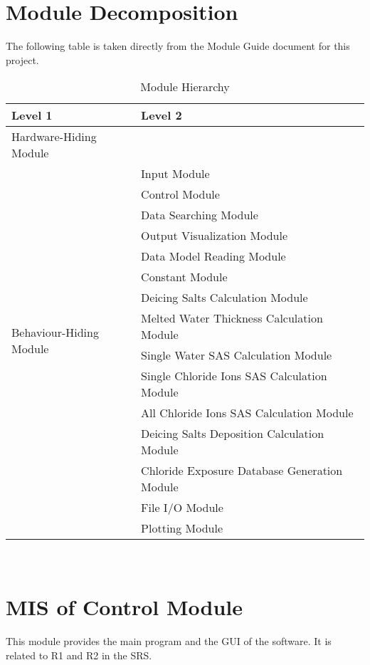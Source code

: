 \documentclass[12pt, titlepage]{article}
\begin{document}
\section{Module Decomposition}

The following table is taken directly from the Module Guide document for this project.
\begin{table}[h!]
\centering
\begin{tabular}{p{} p{}}
\toprule
\textbf{Level 1} & \textbf{Level 2}\\
\midrule

{Hardware-Hiding Module} & ~ \\
\midrule

\multirow{14}{0.3\textwidth}{Behaviour-Hiding Module} & Input Module\\
& Control Module\\
& Data Searching Module\\
& Output Visualization Module\\
& Data Model Reading Module \\
& Constant Module \\
& Deicing Salts Calculation Module \\
& Melted Water Thickness Calculation Module \\
& Single Water SAS Calculation Module \\
& Single Chloride Ions SAS Calculation Module \\
& All Chloride Ions SAS Calculation Module \\
& Deicing Salts Deposition Calculation Module \\
& Chloride Exposure Database Generation Module\\
\midrule

\multirow{2}{0.3\textwidth}{Software Decision Module} &  File I/O Module \\
& Plotting Module \\
\bottomrule

\end{tabular}
\caption{Module Hierarchy}
\label{TblMH}
\end{table}
\newpage
~\newpage

\section{MIS of Control Module} \label{controlModule} 
This module provides the main program and the GUI of the software. It is related to R1 and R2 in the SRS.
\end{document}
